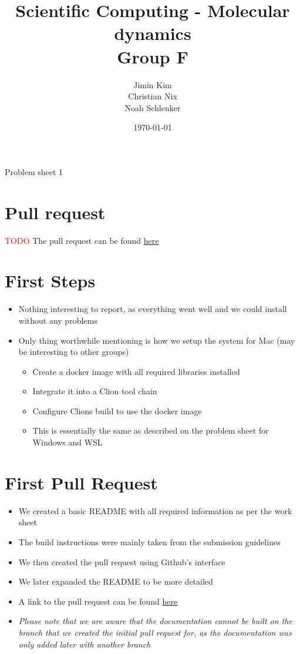 \documentclass{article}
\title{Scientific Computing - Molecular dynamics \\ Group F}
\author{
    Jimin Kim \\
    Christian Nix \\
    Noah Schlenker
}
\date{\today}
\newcommand{\subtitle}{Problem sheet 1}
\begin{document}
\maketitle

\begin{center}
    \LARGE \subtitle{}
\end{center}

\section{Pull request}
\textcolor{red}{TODO}
The pull request can be found \href{www.google.com}{here}

\section{First Steps}

\begin{itemize}
    \item Nothing interesting to report, as everything went well and we could install without any problems
    \item Only thing worthwhile mentioning is how we setup the system for Mac (may be interesting to other groups)
    \begin{itemize}
        \item Create a docker image with all required libraries installed
        \item Integrate it into a Clion tool chain
        \item Configure Clions build to use the docker image
        \item This is essentially the same as described on the problem sheet for Windows and WSL 
    \end{itemize}
\end{itemize}

\section{First Pull Request}

\begin{itemize}
    \item We created a basic README with all required information as per the work sheet
    \item The build instructions were mainly taken from the submission guidelines
    \item We then created the pull request using Github's interface
    \item We later expanded the README to be more detailed
    \item A link to the pull request can be found \href{https://github.com/noahpy/MolSim-SS24/pull/1}{here}
    \item \emph{Please note that we are aware that the documentation cannot be built on the branch that we created the initial pull request for, as the documentation was only added later with another branch}
\end{itemize}
\end{document}
